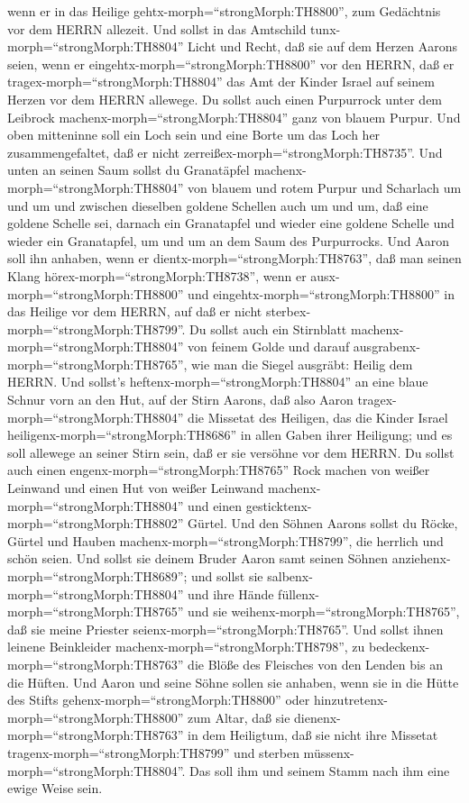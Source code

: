 wenn er in das Heilige gehtx-morph=``strongMorph:TH8800'', zum
Gedächtnis vor dem HERRN allezeit.  Und sollst in das
Amtschild tunx-morph=``strongMorph:TH8804'' Licht und Recht, daß sie auf
dem Herzen Aarons seien, wenn er eingehtx-morph=``strongMorph:TH8800''
vor den HERRN, daß er tragex-morph=``strongMorph:TH8804'' das Amt der
Kinder Israel auf seinem Herzen vor dem HERRN allewege.  Du
sollst auch einen Purpurrock unter dem Leibrock
machenx-morph=``strongMorph:TH8804'' ganz von blauem Purpur.
 Und oben mitteninne soll ein Loch sein und eine Borte um
das Loch her zusammengefaltet, daß er nicht
zerreißex-morph=``strongMorph:TH8735''.  Und unten an
seinen Saum sollst du Granatäpfel machenx-morph=``strongMorph:TH8804''
von blauem und rotem Purpur und Scharlach um und um und zwischen
dieselben goldene Schellen auch um und um,  daß eine
goldene Schelle sei, darnach ein Granatapfel und wieder eine goldene
Schelle und wieder ein Granatapfel, um und um an dem Saum des
Purpurrocks.  Und Aaron soll ihn anhaben, wenn er
dientx-morph=``strongMorph:TH8763'', daß man seinen Klang
hörex-morph=``strongMorph:TH8738'', wenn er
ausx-morph=``strongMorph:TH8800'' und
eingehtx-morph=``strongMorph:TH8800'' in das Heilige vor dem HERRN, auf
daß er nicht sterbex-morph=``strongMorph:TH8799''.  Du
sollst auch ein Stirnblatt machenx-morph=``strongMorph:TH8804'' von
feinem Golde und darauf ausgrabenx-morph=``strongMorph:TH8765'', wie man
die Siegel ausgräbt: Heilig dem HERRN.  Und sollst's
heftenx-morph=``strongMorph:TH8804'' an eine blaue Schnur vorn an den
Hut,  auf der Stirn Aarons, daß also Aaron
tragex-morph=``strongMorph:TH8804'' die Missetat des Heiligen, das die
Kinder Israel heiligenx-morph=``strongMorph:TH8686'' in allen Gaben
ihrer Heiligung; und es soll allewege an seiner Stirn sein, daß er sie
versöhne vor dem HERRN.  Du sollst auch einen
engenx-morph=``strongMorph:TH8765'' Rock machen von weißer Leinwand und
einen Hut von weißer Leinwand machenx-morph=``strongMorph:TH8804'' und
einen gesticktenx-morph=``strongMorph:TH8802'' Gürtel.  Und
den Söhnen Aarons sollst du Röcke, Gürtel und Hauben
machenx-morph=``strongMorph:TH8799'', die herrlich und schön seien.
 Und sollst sie deinem Bruder Aaron samt seinen Söhnen
anziehenx-morph=``strongMorph:TH8689''; und sollst sie
salbenx-morph=``strongMorph:TH8804'' und ihre Hände
füllenx-morph=``strongMorph:TH8765'' und sie
weihenx-morph=``strongMorph:TH8765'', daß sie meine Priester
seienx-morph=``strongMorph:TH8765''.  Und sollst ihnen
leinene Beinkleider machenx-morph=``strongMorph:TH8798'', zu
bedeckenx-morph=``strongMorph:TH8763'' die Blöße des Fleisches von den
Lenden bis an die Hüften.  Und Aaron und seine Söhne sollen
sie anhaben, wenn sie in die Hütte des Stifts
gehenx-morph=``strongMorph:TH8800'' oder
hinzutretenx-morph=``strongMorph:TH8800'' zum Altar, daß sie
dienenx-morph=``strongMorph:TH8763'' in dem Heiligtum, daß sie nicht
ihre Missetat tragenx-morph=``strongMorph:TH8799'' und sterben
müssenx-morph=``strongMorph:TH8804''. Das soll ihm und seinem Stamm nach
ihm eine ewige Weise sein.

